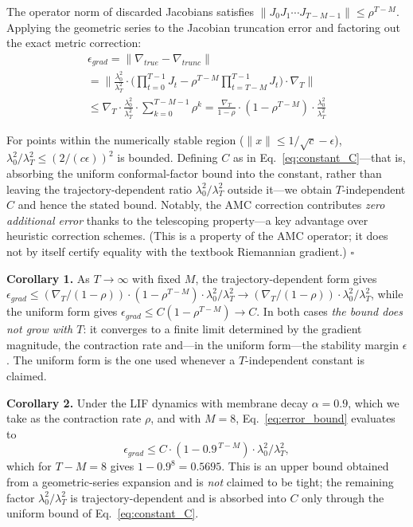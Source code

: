 \documentclass[a4paper,fleqn]{cas-dc}
\begin{document}
The operator norm of discarded Jacobians satisfies $\|J_0 J_1 \cdots J_{T-M-1}\| \leq \rho^{T-M}$. Applying the geometric series to the Jacobian truncation error and factoring out the exact metric correction:
\begin{multline}
\epsilon_{grad} = \|\nabla_{true} - \nabla_{trunc}\| \\
= \Big\|\frac{\lambda_0^2}{\lambda_T^2} \cdot
   \bigl({\textstyle\prod_{t=0}^{T-1}} J_t -
    \rho^{T-M} {\textstyle\prod_{t=T-M}^{T-1}} J_t\bigr) \cdot
   \nabla_T\Big\| \\
\leq \nabla_T \cdot \frac{\lambda_0^2}{\lambda_T^2} \cdot
   \sum_{k=0}^{T-M-1} \rho^k
 = \frac{\nabla_T}{1-\rho} \cdot (1 - \rho^{T-M}) \cdot
   \frac{\lambda_0^2}{\lambda_T^2}
\label{eq:proof_bound}
\end{multline}

For points within the numerically stable region ($\|x\| \leq 1/\sqrt{c} - \epsilon$), $\lambda_0^2/\lambda_T^2 \leq (2/(c\epsilon))^2$ is bounded. Defining $C$ as in Eq.~\eqref{eq:constant_C}---that is, absorbing the uniform conformal-factor bound into the constant, rather than leaving the trajectory-dependent ratio $\lambda_0^2/\lambda_T^2$ outside it---we obtain $T$-independent $C$ and hence the stated bound. Notably, the AMC correction contributes \textit{zero additional error} thanks to the telescoping property---a key advantage over heuristic correction schemes. (This is a property of the AMC operator; it does not by itself certify equality with the textbook Riemannian gradient.) $\square$

\textbf{Corollary 1.} As $T \to \infty$ with fixed $M$, the trajectory-dependent form gives $\epsilon_{grad} \leq (\nabla_T/(1-\rho))\cdot(1-\rho^{T-M})\cdot\lambda_0^2/\lambda_T^2 \to (\nabla_T/(1-\rho))\cdot\lambda_0^2/\lambda_T^2$, while the uniform form gives $\epsilon_{grad} \leq C(1-\rho^{T-M}) \to C$. In both cases \emph{the bound does not grow with $T$}: it converges to a finite limit determined by the gradient magnitude, the contraction rate and---in the uniform form---the stability margin $\epsilon$. The uniform form is the one used whenever a $T$-independent constant is claimed.

\textbf{Corollary 2.} Under the LIF dynamics with membrane decay $\alpha{=}0.9$, which we take as the contraction rate $\rho$, and with $M{=}8$, Eq.~\eqref{eq:error_bound} evaluates to
\begin{equation}
\epsilon_{grad} \leq C \cdot \left(1 - 0.9^{\,T-M}\right) \cdot \lambda_0^2/\lambda_T^2,
\label{eq:corollary2}
\end{equation}
which for $T{-}M{=}8$ gives $1 - 0.9^{8} = 0.5695$. This is an upper bound obtained from a geometric-series expansion and is \emph{not} claimed to be tight; the remaining factor $\lambda_0^2/\lambda_T^2$ is trajectory-dependent and is absorbed into $C$ only through the uniform bound of Eq.~\eqref{eq:constant_C}.
\end{document}
